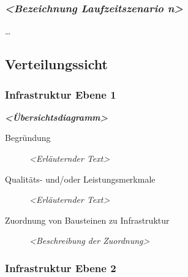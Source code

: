 \subsubsection{\texorpdfstring{\emph{\textless{}Bezeichnung
Laufzeitszenario
n\textgreater{}}}{\textless{}Bezeichnung Laufzeitszenario n\textgreater{}}}\label{__emphasis_bezeichnung_laufzeitszenario_n_emphasis}

\ldots{}

\subsection{Verteilungssicht}\label{section-deployment-view}

\subsubsection{Infrastruktur Ebene 1}\label{_infrastruktur_ebene_1}

\emph{\textbf{\textless{}Übersichtsdiagramm\textgreater{}}}

\begin{description}
\item[Begründung]
\emph{\textless{}Erläuternder Text\textgreater{}}
\item[Qualitäts- und/oder Leistungsmerkmale]
\emph{\textless{}Erläuternder Text\textgreater{}}
\item[Zuordnung von Bausteinen zu Infrastruktur]
\emph{\textless{}Beschreibung der Zuordnung\textgreater{}}
\end{description}

\subsubsection{Infrastruktur Ebene 2}\label{_infrastruktur_ebene_2}






